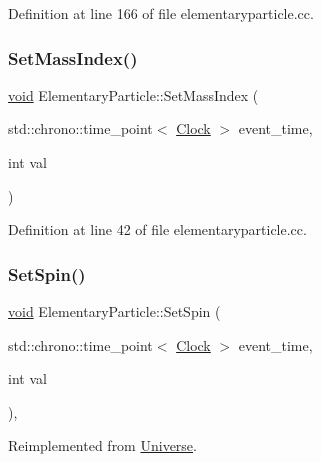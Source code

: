 Definition at line 166 of file elementaryparticle.\+cc.

\mbox{\label{class_elementary_particle_a8a3b91409772f4091a782624a34024e7}} 
\subsubsection{\texorpdfstring{Set\+Mass\+Index()}{SetMassIndex()}}
{\footnotesize\ttfamily \mbox{\hyperlink{glad_8h_a950fc91edb4504f62f1c577bf4727c29}{void}} Elementary\+Particle\+::\+Set\+Mass\+Index (\begin{DoxyParamCaption}\item[{std\+::chrono\+::time\+\_\+point$<$ \mbox{\hyperlink{universe_8h_a0ef8d951d1ca5ab3cfaf7ab4c7a6fd80}{Clock}} $>$}]{event\+\_\+time,  }\item[{int}]{val }\end{DoxyParamCaption})}



Definition at line 42 of file elementaryparticle.\+cc.

\mbox{\label{class_elementary_particle_a437fa86d88157314b84662b158d52353}} 
\subsubsection{\texorpdfstring{Set\+Spin()}{SetSpin()}}
{\footnotesize\ttfamily \mbox{\hyperlink{glad_8h_a950fc91edb4504f62f1c577bf4727c29}{void}} Elementary\+Particle\+::\+Set\+Spin (\begin{DoxyParamCaption}\item[{std\+::chrono\+::time\+\_\+point$<$ \mbox{\hyperlink{universe_8h_a0ef8d951d1ca5ab3cfaf7ab4c7a6fd80}{Clock}} $>$}]{event\+\_\+time,  }\item[{int}]{val }\end{DoxyParamCaption})\hspace{0.3cm}{\ttfamily [inline]}, {\ttfamily [virtual]}}



Reimplemented from \mbox{\hyperlink{class_universe_ae2ae1c3b3e4cde2c18f5f6a814761ec8}{Universe}}.



